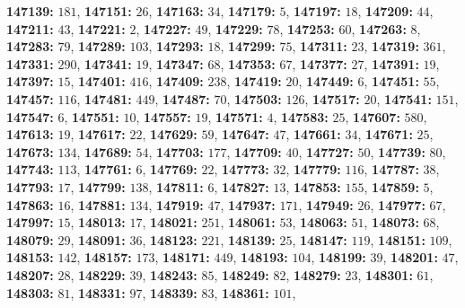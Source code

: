 \textsf{\bfseries 147139:} $181$, \textsf{\bfseries 147151:} $26$, \textsf{\bfseries 147163:} $34$, \textsf{\bfseries 147179:} $5$, \textsf{\bfseries 147197:} $18$, \textsf{\bfseries 147209:} $44$, \textsf{\bfseries 147211:} $43$, \textsf{\bfseries 147221:} $2$, \textsf{\bfseries 147227:} $49$, \textsf{\bfseries 147229:} $78$, \textsf{\bfseries 147253:} $60$, \textsf{\bfseries 147263:} $8$, \textsf{\bfseries 147283:} $79$, \textsf{\bfseries 147289:} $103$, \textsf{\bfseries 147293:} $18$, \textsf{\bfseries 147299:} $75$, \textsf{\bfseries 147311:} $23$, \textsf{\bfseries 147319:} $361$, \textsf{\bfseries 147331:} $290$, \textsf{\bfseries 147341:} $19$, \textsf{\bfseries 147347:} $68$, \textsf{\bfseries 147353:} $67$, \textsf{\bfseries 147377:} $27$, \textsf{\bfseries 147391:} $19$, \textsf{\bfseries 147397:} $15$, \textsf{\bfseries 147401:} $416$, \textsf{\bfseries 147409:} $238$, \textsf{\bfseries 147419:} $20$, \textsf{\bfseries 147449:} $6$, \textsf{\bfseries 147451:} $55$, \textsf{\bfseries 147457:} $116$, \textsf{\bfseries 147481:} $449$, \textsf{\bfseries 147487:} $70$, \textsf{\bfseries 147503:} $126$, \textsf{\bfseries 147517:} $20$, \textsf{\bfseries 147541:} $151$, \textsf{\bfseries 147547:} $6$, \textsf{\bfseries 147551:} $10$, \textsf{\bfseries 147557:} $19$, \textsf{\bfseries 147571:} $4$, \textsf{\bfseries 147583:} $25$, \textsf{\bfseries 147607:} $580$, \textsf{\bfseries 147613:} $19$, \textsf{\bfseries 147617:} $22$, \textsf{\bfseries 147629:} $59$, \textsf{\bfseries 147647:} $47$, \textsf{\bfseries 147661:} $34$, \textsf{\bfseries 147671:} $25$, \textsf{\bfseries 147673:} $134$, \textsf{\bfseries 147689:} $54$, \textsf{\bfseries 147703:} $177$, \textsf{\bfseries 147709:} $40$, \textsf{\bfseries 147727:} $50$, \textsf{\bfseries 147739:} $80$, \textsf{\bfseries 147743:} $113$, \textsf{\bfseries 147761:} $6$, \textsf{\bfseries 147769:} $22$, \textsf{\bfseries 147773:} $32$, \textsf{\bfseries 147779:} $116$, \textsf{\bfseries 147787:} $38$, \textsf{\bfseries 147793:} $17$, \textsf{\bfseries 147799:} $138$, \textsf{\bfseries 147811:} $6$, \textsf{\bfseries 147827:} $13$, \textsf{\bfseries 147853:} $155$, \textsf{\bfseries 147859:} $5$, \textsf{\bfseries 147863:} $16$, \textsf{\bfseries 147881:} $134$, \textsf{\bfseries 147919:} $47$, \textsf{\bfseries 147937:} $171$, \textsf{\bfseries 147949:} $26$, \textsf{\bfseries 147977:} $67$, \textsf{\bfseries 147997:} $15$, \textsf{\bfseries 148013:} $17$, \textsf{\bfseries 148021:} $251$, \textsf{\bfseries 148061:} $53$, \textsf{\bfseries 148063:} $51$, \textsf{\bfseries 148073:} $68$, \textsf{\bfseries 148079:} $29$, \textsf{\bfseries 148091:} $36$, \textsf{\bfseries 148123:} $221$, \textsf{\bfseries 148139:} $25$, \textsf{\bfseries 148147:} $119$, \textsf{\bfseries 148151:} $109$, \textsf{\bfseries 148153:} $142$, \textsf{\bfseries 148157:} $173$, \textsf{\bfseries 148171:} $449$, \textsf{\bfseries 148193:} $104$, \textsf{\bfseries 148199:} $39$, \textsf{\bfseries 148201:} $47$, \textsf{\bfseries 148207:} $28$, \textsf{\bfseries 148229:} $39$, \textsf{\bfseries 148243:} $85$, \textsf{\bfseries 148249:} $82$, \textsf{\bfseries 148279:} $23$, \textsf{\bfseries 148301:} $61$, \textsf{\bfseries 148303:} $81$, \textsf{\bfseries 148331:} $97$, \textsf{\bfseries 148339:} $83$, \textsf{\bfseries 148361:} $101$, 
